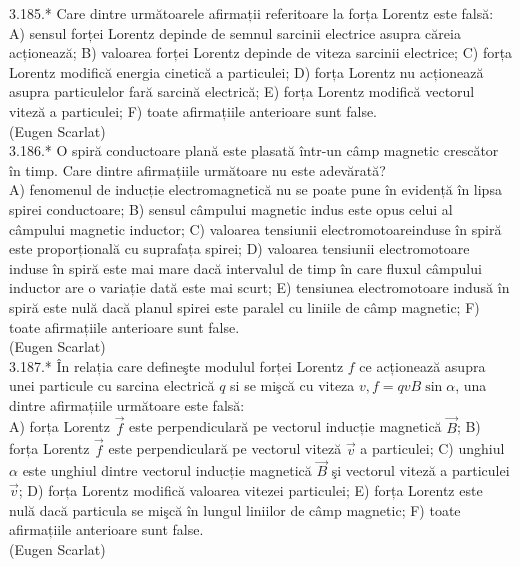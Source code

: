 3.185.* Care dintre următoarele afirmații referitoare la forța Lorentz este falsă:\\ A) sensul forței Lorentz depinde de semnul sarcinii electrice asupra căreia acționează; B) valoarea forței Lorentz depinde de viteza sarcinii electrice; C) forța Lorentz modifică energia cinetică a particulei; D) forța Lorentz nu acționează asupra particulelor fară sarcină electrică; E) forța Lorentz modifică vectorul viteză a particulei; F) toate afirmațiile anterioare sunt false.\\ (Eugen Scarlat)\\

3.186.* O spiră conductoare plană este plasată într-un câmp magnetic crescător în timp. Care dintre afirmațiile următoare nu este adevărată?\\ A) fenomenul de inducție electromagnetică nu se poate pune în evidență în lipsa spirei conductoare; B) sensul câmpului magnetic indus este opus celui al câmpului magnetic inductor; C) valoarea tensiunii electromotoareinduse în spiră este proporțională cu suprafața spirei; D) valoarea tensiunii electromotoare induse în spiră este mai mare dacă intervalul de timp în care fluxul câmpului inductor are o variație dată este mai scurt; E) tensiunea electromotoare indusă în spiră este nulă dacă planul spirei este paralel cu liniile de câmp magnetic; F) toate afirmațiile anterioare sunt false.\\ (Eugen Scarlat)\\

3.187.* În relația care defineşte modulul forței Lorentz $f$ ce acționează asupra unei particule cu sarcina electrică $q$ si se mişcă cu viteza $v, f=q v B \sin \alpha$, una dintre afirmațiile următoare este falsă:\\ A) forța Lorentz $\vec{f}$ este perpendiculară pe vectorul inducție magnetică $\vec{B}$; B) forța Lorentz $\vec{f}$ este perpendiculară pe vectorul viteză $\vec{v}$ a particulei; C) unghiul $\alpha$ este unghiul dintre vectorul inducție magnetică $\vec{B}$ şi vectorul viteză a particulei $\vec{v}$; D) forța Lorentz modifică valoarea vitezei particulei; E) forța Lorentz este nulă dacă particula se mişcă în lungul liniilor de câmp magnetic; F) toate afirmațiile anterioare sunt false.\\ (Eugen Scarlat)\\

